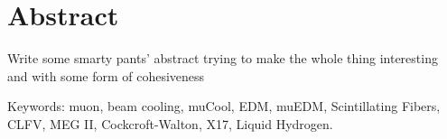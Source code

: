\thispagestyle{plain}			%
\setlength{\parskip}{0pt plus 1.0pt}
\section*{Abstract}
Write some smarty pants' abstract trying to make the whole thing interesting and with some form of cohesiveness

\vfill
Keywords: muon, beam cooling, muCool, EDM, muEDM, Scintillating Fibers, CLFV, MEG II, Cockcroft-Walton, X17, Liquid Hydrogen.

\thispagestyle{empty}
\mbox{}